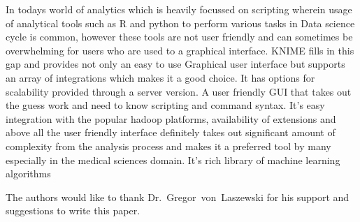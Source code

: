 In todays world of analytics which is heavily focussed on scripting wherein usage of
analytical tools such as R and python to perform various tasks in Data science
cycle is common, however these tools are not user friendly and can sometimes be 
overwhelming for users who are used to a graphical interface. KNIME fills in this gap 
and provides not only an easy to use Graphical user interface but supports an array 
of integrations which makes it a good choice. It has options for scalability provided 
through a server version. A user friendly GUI that takes out the guess work and need 
to know scripting and command syntax. It's easy integration with the popular hadoop 
platforms, availability of extensions and above all the user friendly interface definitely
takes out significant amount of complexity from the analysis process and makes it a 
preferred tool by many especially in the medical sciences domain. It's rich library of 
machine learning algorithms 

\begin{acks}

  The authors would like to thank Dr.~Gregor~von~Laszewski for his support and
  suggestions to write this paper.

\end{acks}


 

